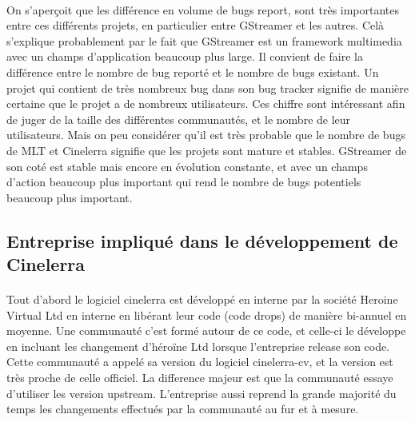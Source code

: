 \paragraph{}

On s'aperçoit que les différence en volume de bugs report, sont très
importantes entre ces différents projets, en particulier entre GStreamer
et les autres. Celà s'explique probablement par le fait que GStreamer
est un framework multimedia avec un champs d'application beaucoup
plus large. Il convient de faire la différence entre le nombre de bug
reporté et le nombre de bugs existant. Un projet qui contient de très
nombreux bug dans son bug tracker signifie de manière certaine que le
projet a de nombreux utilisateurs. Ces chiffre sont intéressant afin de
juger de la taille des différentes communautés, et le nombre de leur
utilisateurs. Mais on peu considérer qu'il est très probable que le
nombre de bugs de MLT et Cinelerra signifie que les projets
sont mature et stables. GStreamer de son coté est stable mais encore en
évolution constante, et avec un champs d'action beaucoup plus important
qui rend le nombre de bugs potentiels beaucoup plus important.

\subsection {Entreprise impliqué dans le développement de Cinelerra}

\paragraph{}

Tout d'abord le logiciel cinelerra est développé en interne par la
société Heroine Virtual Ltd en interne en libérant leur code (code
drops) de manière bi-annuel en moyenne. Une communauté c'est formé
autour de ce code, et celle-ci le développe en incluant les changement
d'héroïne Ltd lorsque l'entreprise release son code. Cette communauté
a appelé sa version du logiciel cinelerra-cv, et la version est très
proche de celle officiel. La difference majeur est que la communauté
essaye d'utiliser les version upstream. L'entreprise aussi
reprend la grande majorité du temps les changements effectués par la
communauté au fur et à mesure.

\paragraph{}

